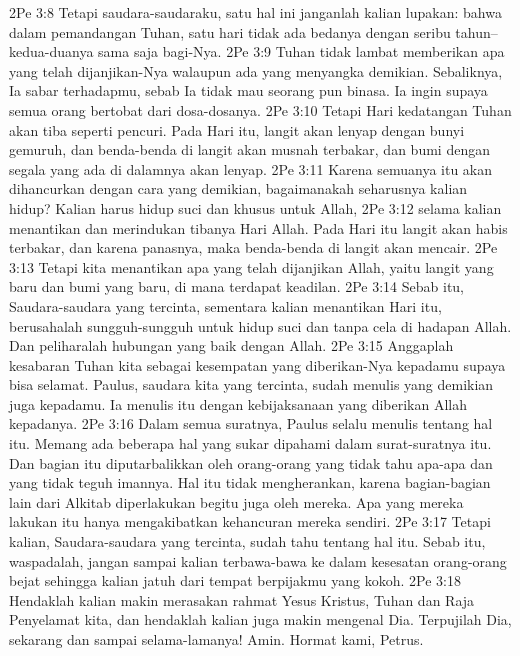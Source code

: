 2Pe 3:8  Tetapi saudara-saudaraku, satu hal ini janganlah kalian lupakan: bahwa dalam pemandangan Tuhan, satu hari tidak ada bedanya dengan seribu tahun--kedua-duanya sama saja bagi-Nya.
2Pe 3:9  Tuhan tidak lambat memberikan apa yang telah dijanjikan-Nya walaupun ada yang menyangka demikian. Sebaliknya, Ia sabar terhadapmu, sebab Ia tidak mau seorang pun binasa. Ia ingin supaya semua orang bertobat dari dosa-dosanya.
2Pe 3:10  Tetapi Hari kedatangan Tuhan akan tiba seperti pencuri. Pada Hari itu, langit akan lenyap dengan bunyi gemuruh, dan benda-benda di langit akan musnah terbakar, dan bumi dengan segala yang ada di dalamnya akan lenyap.
2Pe 3:11  Karena semuanya itu akan dihancurkan dengan cara yang demikian, bagaimanakah seharusnya kalian hidup? Kalian harus hidup suci dan khusus untuk Allah,
2Pe 3:12  selama kalian menantikan dan merindukan tibanya Hari Allah. Pada Hari itu langit akan habis terbakar, dan karena panasnya, maka benda-benda di langit akan mencair.
2Pe 3:13  Tetapi kita menantikan apa yang telah dijanjikan Allah, yaitu langit yang baru dan bumi yang baru, di mana terdapat keadilan.
2Pe 3:14  Sebab itu, Saudara-saudara yang tercinta, sementara kalian menantikan Hari itu, berusahalah sungguh-sungguh untuk hidup suci dan tanpa cela di hadapan Allah. Dan peliharalah hubungan yang baik dengan Allah.
2Pe 3:15  Anggaplah kesabaran Tuhan kita sebagai kesempatan yang diberikan-Nya kepadamu supaya bisa selamat. Paulus, saudara kita yang tercinta, sudah menulis yang demikian juga kepadamu. Ia menulis itu dengan kebijaksanaan yang diberikan Allah kepadanya.
2Pe 3:16  Dalam semua suratnya, Paulus selalu menulis tentang hal itu. Memang ada beberapa hal yang sukar dipahami dalam surat-suratnya itu. Dan bagian itu diputarbalikkan oleh orang-orang yang tidak tahu apa-apa dan yang tidak teguh imannya. Hal itu tidak mengherankan, karena bagian-bagian lain dari Alkitab diperlakukan begitu juga oleh mereka. Apa yang mereka lakukan itu hanya mengakibatkan kehancuran mereka sendiri.
2Pe 3:17  Tetapi kalian, Saudara-saudara yang tercinta, sudah tahu tentang hal itu. Sebab itu, waspadalah, jangan sampai kalian terbawa-bawa ke dalam kesesatan orang-orang bejat sehingga kalian jatuh dari tempat berpijakmu yang kokoh.
2Pe 3:18  Hendaklah kalian makin merasakan rahmat Yesus Kristus, Tuhan dan Raja Penyelamat kita, dan hendaklah kalian juga makin mengenal Dia. Terpujilah Dia, sekarang dan sampai selama-lamanya! Amin. Hormat kami, Petrus.



